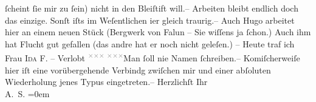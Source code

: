 \begin{ledgroupsized}[t]{13cm}
               ſcheint ſie mir zu ſein) nicht in den Bleiſtift will.– \pend
           \pstart
           Arbeiten bleibt endlich doch das einzige. Sonſt iſts im Weſentlichen i{\geminationm}er gleich traurig.– Auch Hugo arbeitet {\pb}hier
               an einem neuen Stück (Bergwerk von Falun – Sie
               wiſſens ja ſchon.) Auch ihm hat Flucht gut
               gefallen \strikeout{(} (das andre hat er noch nicht geleſen.) – \pend
           \pstart
           Heute traf ich Frau \textsc{Ida {\pb}F.} – Verlobt \substVorne{}\textsuperscript{\textcolor{gray}{×}\-\textcolor{gray}{×}\-\textcolor{gray}{×}{ }\textcolor{gray}{×}\-\textcolor{gray}{×}\-\textcolor{gray}{×}}\substDazwischen{}Man ſoll nie Namen ſchreiben\substHinten{}.– Komiſcherweiſe \introOben{}hier\introOben{} iſt eine vorübergehende
               Verbindg zwiſchen mir und einer abſoluten Wiederholung jenes Typus eingetreten.–\pend
           \pstart
           Herzlichſt Ihr{\\[\baselineskip]}\spacefill\mbox{A. S.}\pend
           \leftskip=0em{}
         
         \endnumbering{}\end{ledgroupsized}\begin{anhang}\end{anhang}\newcommand{\dateiname}{L02967}\newcommand{\titel}{Arthur Schnitzler an Felix Salten, 4. 9. 1899}\newcommand{\editorInnen}{Martin Anton Müller und Laura Untner}
      